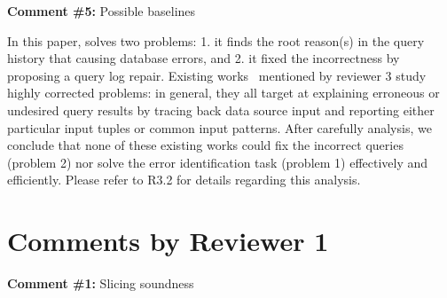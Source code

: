 \comskip

\noindent
\textbf{Comment \#5:} Possible baselines
\begin{quote}
\end{quote}

In this paper, \sys solves two problems: 1. it finds the root reason(s) in the
query history that causing database errors, and 2. it fixed the incorrectness
by proposing a query log repair. Existing works~\cite{Wu13, roy2014formal,
chalamalla2014,meliou2011tracing} mentioned by reviewer 3 study highly
corrected problems: in general, they all target at explaining erroneous or
undesired query results by tracing back data source input and reporting either
particular input tuples or common input patterns. After carefully analysis, we
conclude that none of these existing works could fix the incorrect queries
(problem 2) nor solve the error identification task (problem 1) effectively
and efficiently. Please refer to R3.2 for details regarding this analysis.



\section*{Comments by Reviewer 1}

\noindent
\textbf{Comment \#1:} Slicing soundness
\begin{quote}
\end{quote}

